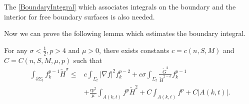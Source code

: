 The \autoref{BoundaryIntegral} which associates integrals on the boundary and the interior for free boundary surfaces is also needed.

Now we can prove the following lemma which estimates the boundary integral.

\begin{lemma} \label{BoundaryFH}
    For any $\sigma <\frac{1}{2}, p>4$ and $\mu >0$, there exists constants $c=c(n,S,M)$ and $C=C(n,S,M,\mu ,p)$ such that
    \begin{equation}
    \begin{split}
        \int_{\partial \Sigma_t} f_{k}^{p-1}\tilde{H}^{\sigma } 
    \leq & c \int_{\Sigma_t} \left| \nabla f \right| ^2 f_{k}^{p-2} +c \sigma \int_{\Sigma_t} \frac{\tilde{G}^{2} }{\tilde{H}^{2-\sigma }  }f_{k}^{p-1} \\
    &+ \frac{cp^2}{\mu }\int_{A(k,t)}^{}f^p \tilde{H}^{2} + C \int_{A(k,t)}^{}f^p + C \left| A(k,t) \right| .
    \end{split}
    \end{equation} 
\end{lemma}

